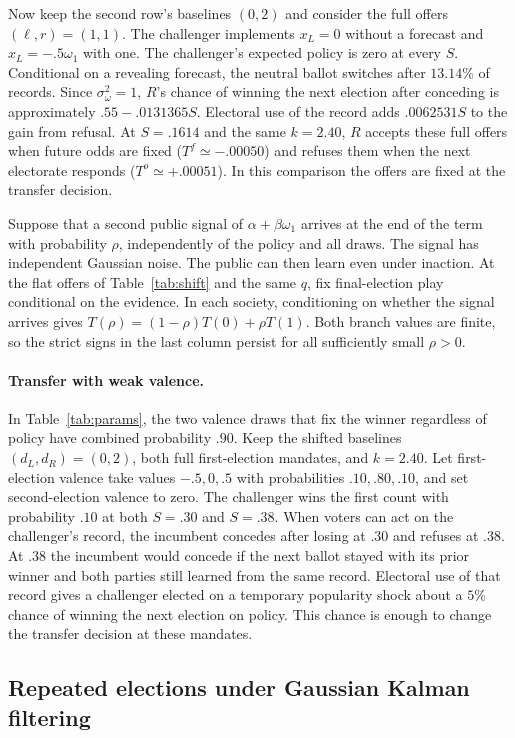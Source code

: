 \documentclass[11pt,letterpaper]{article}
\begin{document}
Now keep the second row's baselines $(0,2)$ and consider the full offers $(\ell,r)=(1,1)$. The challenger implements $x_L=0$ without a forecast and $x_L=-.5\omega_1$ with one. The challenger's expected policy is zero at every $S$. Conditional on a revealing forecast, the neutral ballot switches after $13.14\%$ of records. Since $\sigma_\omega^2=1$, $R$'s chance of winning the next election after conceding is approximately $.55-.0131365S$. Electoral use of the record adds $.0062531S$ to the gain from refusal. At $S=.1614$ and the same $k=2.40$, $R$ accepts these full offers when future odds are fixed ($T^f\simeq-.00050$) and refuses them when the next electorate responds ($T^o\simeq+.00051$). In this comparison the offers are fixed at the transfer decision.

Suppose that a second public signal of $\alpha+\beta\omega_1$ arrives at the end of the term with probability $\rho$, independently of the policy and all draws. The signal has independent Gaussian noise. The public can then learn even under inaction. At the flat offers of Table~\ref{tab:shift} and the same $q$, fix final-election play conditional on the evidence. In each society, conditioning on whether the signal arrives gives $T(\rho)=(1-\rho)T(0)+\rho T(1)$. Both branch values are finite, so the strict signs in the last column persist for all sufficiently small $\rho>0$.

\paragraph{Transfer with weak valence.}
In Table~\ref{tab:params}, the two valence draws that fix the winner regardless of policy have combined probability $.90$. Keep the shifted baselines $(d_L,d_R)=(0,2)$, both full first-election mandates, and $k=2.40$. Let first-election valence take values $-.5,0,.5$ with probabilities $.10,.80,.10$, and set second-election valence to zero. The challenger wins the first count with probability $.10$ at both $S=.30$ and $S=.38$. When voters can act on the challenger's record, the incumbent concedes after losing at $.30$ and refuses at $.38$. At $.38$ the incumbent would concede if the next ballot stayed with its prior winner and both parties still learned from the same record. Electoral use of that record gives a challenger elected on a temporary popularity shock about a $5\%$ chance of winning the next election on policy. This chance is enough to change the transfer decision at these mandates.

\subsection{Repeated elections under Gaussian Kalman filtering}
\end{document}
